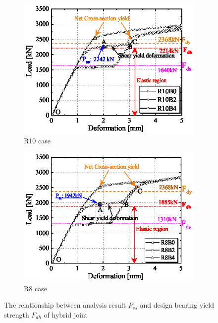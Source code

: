 \begin{figure}[htbp]
\centering
    \begin{subfigure}[t]{0.49\textwidth}
      \centering
      \includegraphics[width=\linewidth]{imgs/ch5/LD-A-R10Fdh.eps}
      \caption{R10 case}
      \label{fig-r10fdh}
    \end{subfigure}
    \hfill
    \begin{subfigure}[t]{0.49\textwidth}
      \centering
    \includegraphics[width=\linewidth]{imgs/ch5/LD-A-R8Fdh.eps}
      \caption{R8 case}
      \label{fig-r8fdh}
    \end{subfigure}
\caption{The relationship between analysis result $P_{ss}$ and design bearing yield strength $F_{dh}$ of hybrid joint}
\label{fig-fdbpss}
\end{figure}

